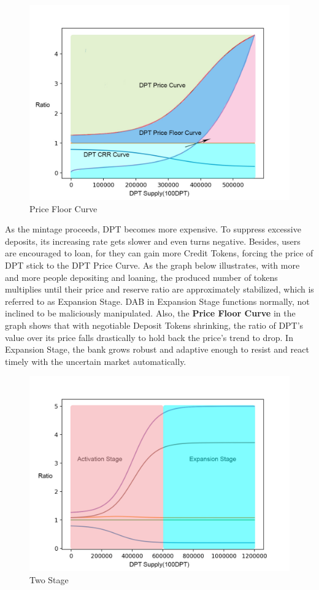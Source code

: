 \documentclass[review]{elsarticle}
\begin{document}
\begin{figure}[H]
\begin{center}
\includegraphics[width=4.5in]{Graphs/PriceFloorCurve.jpg}
\end{center}
\caption{Price Floor Curve}\label{PFC}
\end{figure}

As the mintage proceeds, DPT becomes more expensive. To suppress excessive deposits, its increasing rate gets slower and even turns negative. Besides, users are encouraged to loan, for they can gain more Credit Tokens, forcing the price of DPT stick to the DPT Price Curve. As the graph below illustrates, with more and more people depositing and loaning, the produced number of tokens multiplies until their price and reserve ratio are approximately stabilized, which is referred to as Expansion Stage. DAB in Expansion Stage functions normally, not inclined to be maliciously manipulated. Also, the \textbf{Price Floor Curve} in the graph shows that with negotiable Deposit Tokens shrinking, the ratio of DPT's value over its price falls drastically to hold back the price's trend to drop. In Expansion Stage, the bank grows robust and adaptive enough to resist and react timely with the uncertain market automatically. 

\begin{figure}[H]
\begin{center}
\includegraphics[width=4.5in]{Graphs/Two_Stage.jpg}
\end{center}
\caption{Two Stage}\label{TS}
\end{figure}
\end{document}
